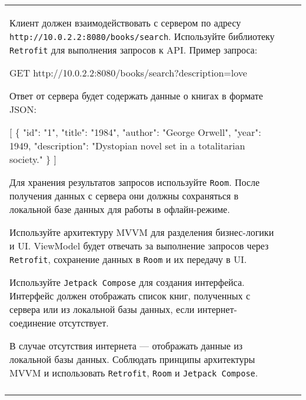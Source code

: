 \documentclass[a4paper]{article}
\begin{document}
\begin{tabular}{!{\vrule width 2pt}p{5cm}|p{6cm}|p{4cm}!{\vrule width 2pt}}
{\begin{minipage}{16cm}
\begin{enumerate}
Клиент должен взаимодействовать с сервером по адресу \texttt{http://10.0.2.2:8080/books/search}. Используйте библиотеку \texttt{Retrofit} для выполнения запросов к API. Пример запроса:


GET http://10.0.2.2:8080/books/search?description=love


Ответ от сервера будет содержать данные о книгах в формате JSON:


[
  \{
    "id": "1",
    "title": "1984",
    "author": "George Orwell",
    "year": 1949,
    "description": "Dystopian novel set in a totalitarian society."
  \}
]


Для хранения результатов запросов используйте \texttt{Room}. После получения данных с сервера они должны сохраняться в локальной базе данных для работы в офлайн-режиме.

Используйте архитектуру MVVM для разделения бизнес-логики и UI. ViewModel будет отвечать за выполнение запросов через \texttt{Retrofit}, сохранение данных в \texttt{Room} и их передачу в UI.

Используйте \texttt{Jetpack Compose} для создания интерфейса. Интерфейс должен отображать список книг, полученных с сервера или из локальной базы данных, если интернет-соединение отсутствует.

В случае отсутствия интернета — отображать данные из локальной базы данных.
Соблюдать принципы архитектуры MVVM и использовать \texttt{Retrofit}, \texttt{Room} и \texttt{Jetpack Compose}. 
\end{enumerate}

\vspace{0.2cm}
    
\end{minipage}
}
\\
\end{tabular}
\end{document}
